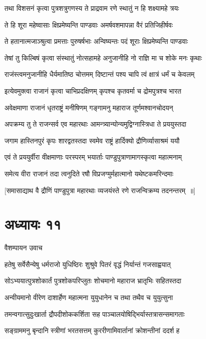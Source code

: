 \twolineshloka
{तथा विशसनं कृत्वा पुत्रशत्रुगणस्य ते}
{प्राद्रवाम रणे स्थातुं न हि शक्ष्यामहे त्रयः}


\twolineshloka
{ते हि शूरा महेष्वासाः क्षिप्रमेष्यन्ति पाण्डवाः}
{अमर्षवशमापन्ना वैरं प्रतिजिहीर्षवः}


\twolineshloka
{ते हतानात्मजाञ्श्रुत्वा प्रमत्ताः पुरुषर्षभाः}
{अन्विष्यन्तः पदं शूराः क्षिप्रमेष्यन्ति पाण्डवाः}


\twolineshloka
{तेषां तु किल्बिषं कृत्वा संस्थातुं नोत्सहामहे}
{अनुजानीहि नो राज्ञि मा च शोके मनः कृथाः}


\twolineshloka
{राजंस्त्वमनुजानीहि धैर्यमातिष्ठ चोत्तमम्}
{दिष्टान्तं पश्य चापि त्वं क्षात्रं धर्मं च केवलम्}


\twolineshloka
{इत्येवमुक्त्वा राजानं कृत्वा चाभिप्रदक्षिणम्}
{कृपश्च कृतवर्मा च द्रोमपुत्रश्च भारत}


\twolineshloka
{अवेक्षमाणा राजानं धृतराष्ट्रं मनीषिणम्}
{गङ्गामनु महाराज तूर्णमश्वानचोदयन्}


\twolineshloka
{अपक्रम्य तु ते राजन्सर्व एव महारथाः}
{आमन्त्र्यान्योन्यमुद्विग्नास्त्रिधा ते प्रययुस्तदा}


\twolineshloka
{जगाम हास्तिनपुरं कृपः शारद्वतस्तदा}
{स्वमेव राष्ट्रं हार्दिक्यो द्रौणिर्व्यासाश्रमं ययौ}


\twolineshloka
{एवं ते प्रययुर्वीरा वीक्षमाणाः परस्परम्}
{भयार्ताः पाण्डुपुत्राणामागस्कृत्वा महात्मनाम्}


\twolineshloka
{समेत्य वीरा राजानं तदा त्वनुदिते रषौ}
{विप्रजग्मुर्महात्मानो यथेष्टकमरिन्दमाः}


\twolineshloka
{[समासाद्याथ वै द्रौणिं पाण्डुपुत्रा महारथाः}
{व्यजयंस्ते रणे राजन्विक्रम्य तदनन्तरम् ॥]}


\chapter{अध्यायः ११}
\twolineshloka
{वैशम्पायन उवाच}
{}


\twolineshloka
{हतेषु सर्वेसैन्येषु धर्मराजो युधिष्ठिरः}
{शुश्रुवे पितरं वृद्धं निर्यान्तं गजसाह्वयात्}


\twolineshloka
{सोऽभ्ययात्पुत्रशोकार्तं पुत्रशोकपरिप्लुतः}
{शोचमानो महाराज भ्रातृभिः सहितस्तदा}


\twolineshloka
{अन्वीयमानो वीरेण दाशार्हेण महात्मना}
{युयुधानेन च तथा तथैव च युयुत्सुना}


\twolineshloka
{तमन्वगात्सुदुःखार्ता द्रौपदीशोककर्शिता}
{सह पाञ्चालयोषिद्भिर्यास्तत्रासन्समागताः}


\twolineshloka
{सङ्ग्राममनु बृन्दानि स्त्रीणां भरतसत्तम्}
{कुररीणामिवार्तानां क्रोशन्तीनां ददर्श ह}


